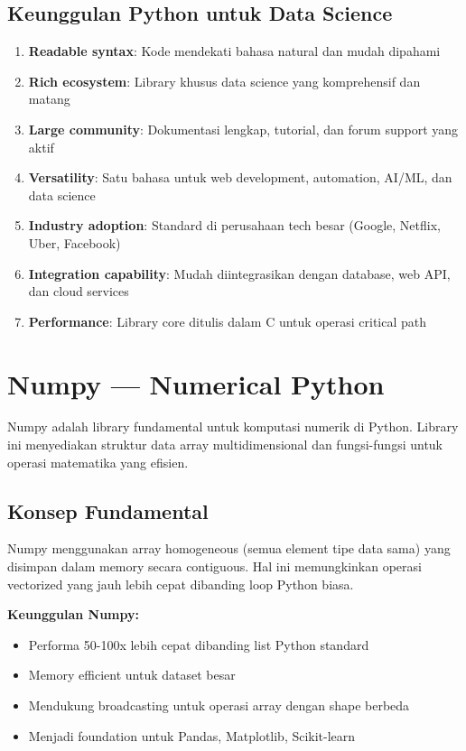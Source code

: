\subsection*{Keunggulan Python untuk Data Science}
\begin{enumerate}
  \item \textbf{Readable syntax}: Kode mendekati bahasa natural dan mudah dipahami
  \item \textbf{Rich ecosystem}: Library khusus data science yang komprehensif dan matang
  \item \textbf{Large community}: Dokumentasi lengkap, tutorial, dan forum support yang aktif
  \item \textbf{Versatility}: Satu bahasa untuk web development, automation, AI/ML, dan data science
  \item \textbf{Industry adoption}: Standard di perusahaan tech besar (Google, Netflix, Uber, Facebook)
  \item \textbf{Integration capability}: Mudah diintegrasikan dengan database, web API, dan cloud services
  \item \textbf{Performance}: Library core ditulis dalam C untuk operasi critical path
\end{enumerate}

\section{Numpy — Numerical Python}

Numpy adalah library fundamental untuk komputasi numerik di Python. Library ini menyediakan struktur data array multidimensional dan fungsi-fungsi untuk operasi matematika yang efisien.

\subsection*{Konsep Fundamental}
Numpy menggunakan array homogeneous (semua element tipe data sama) yang disimpan dalam memory secara contiguous. Hal ini memungkinkan operasi vectorized yang jauh lebih cepat dibanding loop Python biasa.

\textbf{Keunggulan Numpy:}
\begin{itemize}
  \item Performa 50-100x lebih cepat dibanding list Python standard
  \item Memory efficient untuk dataset besar
  \item Mendukung broadcasting untuk operasi array dengan shape berbeda
  \item Menjadi foundation untuk Pandas, Matplotlib, Scikit-learn
\end{itemize}

